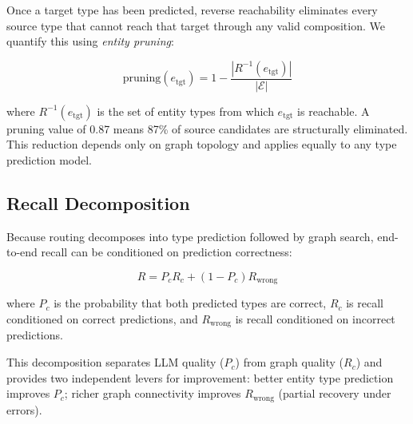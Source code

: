 Once a target type has been predicted, reverse reachability eliminates every source type that cannot reach that target through any valid composition.
We quantify this using \emph{entity pruning}:

\begin{equation}
    \mathrm{pruning}(e_{\mathrm{tgt}})
    =
    1-
    \frac{
        |R^{-1}(e_{\mathrm{tgt}})|
    }{
        |\mathcal{E}|
    }
    \label{eq:entity-pruning}
\end{equation}

where $R^{-1}(e_{\mathrm{tgt}})$ is the set of entity types from which $e_{\mathrm{tgt}}$ is reachable.
A pruning value of 0.87 means 87\% of source candidates are structurally eliminated.
This reduction depends only on graph topology and applies equally to any type prediction model.

\subsection{Recall Decomposition}
\label{sec:recall-decomp}

Because routing decomposes into type prediction followed by graph search, end-to-end recall can be conditioned on prediction correctness:

\begin{equation}
    R
    =
    P_c R_c
    +
    (1-P_c) R_{\text{wrong}}
    \label{eq:recall-decomposition}
\end{equation}

where $P_c$ is the probability that both predicted types are correct,
$R_c$ is recall conditioned on correct predictions,
and $R_{\text{wrong}}$ is recall conditioned on incorrect predictions.

This decomposition separates LLM quality ($P_c$) from graph quality ($R_c$) and provides two independent levers for improvement: better entity type prediction improves $P_c$; richer graph connectivity improves $R_{\text{wrong}}$ (partial recovery under errors).
